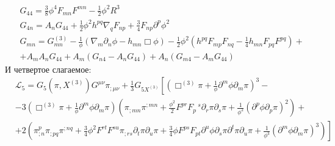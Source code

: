 \documentclass[12pt,a4paper,svgnames]{extarticle}
\begin{document}
\begin{align}
	& G_{44} = \frac{3}{8}\phi^4 F_{m n}F^{m n}-\frac{1}{2}\phi^2R^{3}\\
	& G_{4 n} = A_{n}G_{44}+\frac{1}{2}\phi^2 h^{pq}\nabla_{q}F_{np}+\frac{3}{4}F_{np}\partial^{p}\phi^2\\
	& G_{m n} = G^{(3)}_{m n}- \frac{1}{\phi} \left(\nabla_{m}\partial_{n}\phi - h_{m n}\Box\phi\right) - \frac{1}{2}\phi^2\left(h^{pq}F_{m p}F_{n q} - \frac{1}{4}h_{mn}F_{pq}F^{pq}\right)+\\\nonumber
	&+A_{m}A_{n}G_{44}+A_{m}\left(G_{n4} - A_{n}G_{44}\right)+ A_{n}\left(G_{m4}-A_{m}G_{44}\right)
\end{align}
И четвертое слагаемое:
\begin{align}
	&\mathcal{L}_{5} = G_5\left(\pi, X^{(3)}\right) G^{\mu \nu}\pi_{;\mu\nu} + \frac{1}{3} G_{5X^{(3)}}\left[\left(\Box^{(3)}\pi+ \frac{1}{\phi}\partial^{m}{\phi} \partial_{m}{\pi}\right)^{3}-\right.\nonumber\\
	& - 3\left(\Box^{(3)}\pi+ \frac{1}{\phi}\partial^{m}{\phi} \partial_{m}{\pi}\right)\left(\pi_{;mn}\pi^{;mn} + \frac{{\phi}^{2}}{2}F^{p r} F_{p}\,^{s} \partial_{r}{\pi} \partial_{s}{\pi} +\frac{1}{\phi^2}\left(\partial^{p}{\phi} \partial_{p}{\pi}\right)^2\right)+\nonumber\\
	&\left. + 2\left(\pi_{;n}^p\pi_{;pq}\pi^{;nq}+\frac{3}{4}{\phi}^{2}F^{r t} F^{s u}\pi_{;rs} \partial_{t}{\pi} \partial_{u}{\pi} +\frac{3}{4}\phi F^{p s} F_{p t} \partial^{u}{\phi} \partial_{s}{\pi} \partial^{t}{\pi} \partial_{u}{\pi} +\frac{1}{\phi^3}\left(\partial^{m}{\phi}\partial_{m}{\pi}\right)^{3}\right)\right]
\end{align}
\newpage
\end{document}
